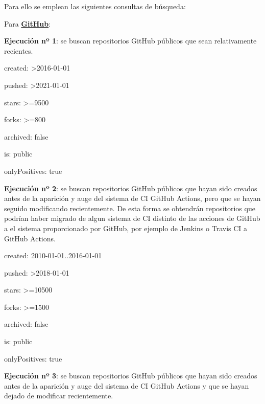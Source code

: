 Para ello se emplean las siguientes consultas de búsqueda:
\begin{compactitem}
    \item Para \textbf{\underline{GitHub}}:
    \begin{compactitem}
        \item \textbf{Ejecución nº 1}: se buscan repositorios GitHub públicos que sean relativamente recientes.
        \begin{compactitem}
            \item created: \textgreater2016-01-01
            \item pushed: \textgreater2021-01-01
            \item stars: \textgreater=9500
            \item forks: \textgreater=800
            \item archived: false
            \item is: public
            \item onlyPositives: true
        \end{compactitem}
        \item \textbf{Ejecución nº 2}: se buscan repositorios GitHub públicos que hayan sido creados antes de la aparición y auge del sistema de CI GitHub Actions, pero que se hayan seguido modificando recientemente. De esta forma se obtendrán repositorios que podrían haber migrado de algun sistema de CI distinto de las acciones de GitHub a el sistema proporcionado por GitHub, por ejemplo de Jenkins o Travis CI a GitHub Actions.
        \begin{compactitem}
            \item created: 2010-01-01..2016-01-01
            \item pushed: \textgreater2018-01-01
            \item stars: \textgreater=10500
            \item forks: \textgreater=1500
            \item archived: false
            \item is: public
            \item onlyPositives: true
        \end{compactitem}
        \item \textbf{Ejecución nº 3}: se buscan repositorios GitHub públicos que hayan sido creados antes de la aparición y auge del sistema de CI GitHub Actions y que se hayan dejado de modificar recientemente.
        \begin{compactitem}

\end{compactitem}
\end{compactitem}
\end{compactitem}
